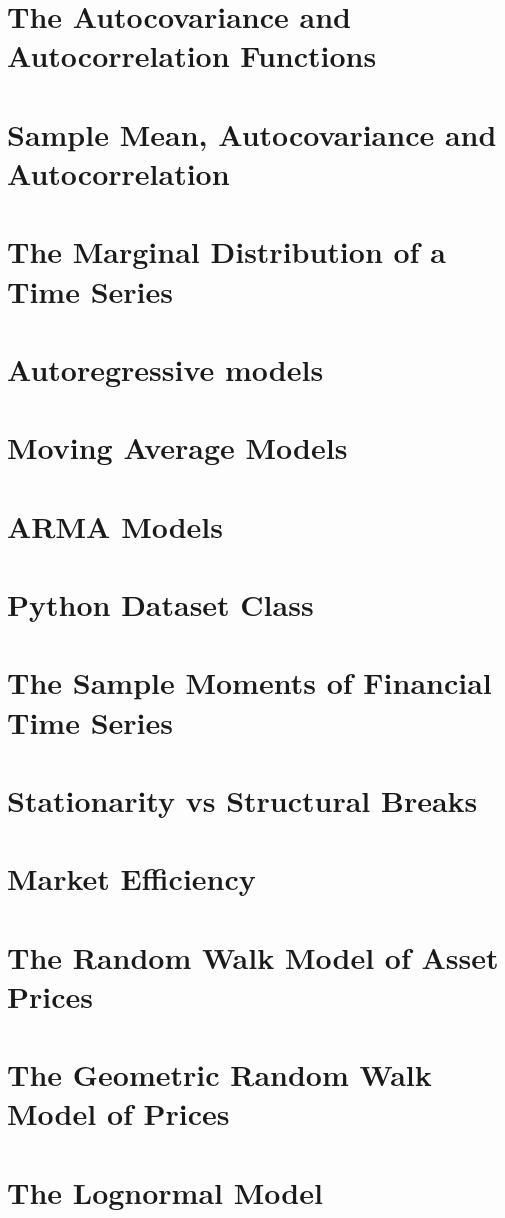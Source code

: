 \documentclass[11pt]{article}
\begin{document}
    \section{The Autocovariance and Autocorrelation Functions}
    \section{Sample Mean, Autocovariance and Autocorrelation}
    \section{The Marginal Distribution of a Time Series}
    \section{Autoregressive models}
    \section{Moving Average Models}
    \section{ARMA Models}
    \section{Python Dataset Class}
    \section{The Sample Moments of Financial Time Series}
    \section{Stationarity vs Structural Breaks}
    \section{Market Efficiency}
    \section{The Random Walk Model of Asset Prices}
    \section{The Geometric Random Walk Model of Prices}
    \section{The Lognormal Model}
\end{document}
